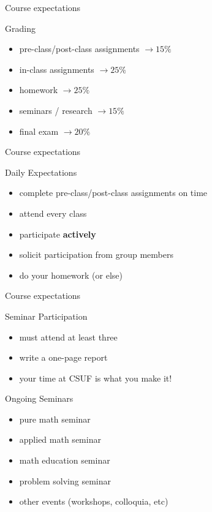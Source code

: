 \documentclass{beamer}
\begin{document}
\begin{frame}{Course expectations}
\pause
  \begin{block}{Grading}
    \begin{itemize}
\pause
      \item pre-class/post-class assignments $\rightarrow 15\%$
\pause
      \item in-class assignments $\rightarrow 25\%$ 
\pause
      \item homework $\rightarrow 25\%$ 
\pause
      \item seminars / research $\rightarrow 15\%$ 
\pause
      \item final exam $\rightarrow 20\%$ 
    \end{itemize}
  \end{block}
\end{frame}

\begin{frame}{Course expectations}
\pause
  \begin{block}{Daily Expectations}
    \begin{itemize}
\pause
      \item complete pre-class/post-class assignments on time
\pause
      \item attend every class 
\pause
      \item participate \textbf{actively}
\pause
      \item solicit participation from group members
\pause
      \item do your homework (or else)
    \end{itemize}
  \end{block}
\end{frame}

\begin{frame}{Course expectations}
\pause
  \begin{block}{Seminar Participation}
    \begin{itemize}
\pause
      \item must attend at least three
\pause
      \item write a one-page report
\pause
      \item your time at CSUF is what you make it!
    \end{itemize}
  \end{block}
\pause
  \begin{block}{Ongoing Seminars}
    \begin{itemize}
\pause
      \item pure math seminar
\pause
      \item applied math seminar
\pause
      \item math education seminar
\pause
      \item problem solving seminar
\pause
      \item other events (workshops, colloquia, etc)
    \end{itemize}
  \end{block}
\end{frame}
\end{document}
